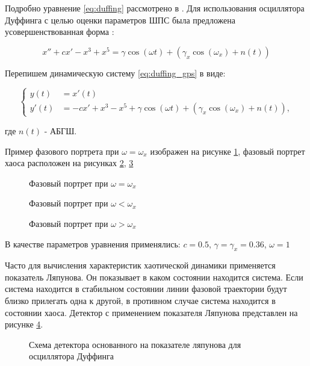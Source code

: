 Подробно уравнение \ref{eq:duffing} рассмотрено в \cite{chaos_neimark_landa}.
Для использования осциллятора Дуффинга с целью оценки параметров ШПС была предложена усовершенствованная форма \cite{chaos_song, chaos_chen}:
\begin{center}
\begin{equation}
	\label{eq:duffing_gps}
	x'' +cx' - x^3 + x^5 = \gamma\cos(\omega{t}) + (\gamma_{x}\cos(\omega_{x}) + n(t))
\end{equation}
\end{center}

Перепишем динамическую систему \ref{eq:duffing_gps} в виде:
\begin{center}
\begin{equation}
	\label{eq:duffing_gps_2}
	\left\{
	\begin{aligned}
		y(t) & = x'(t) \\
		y'(t) & =  -cx' + x^3 - x^5 + \gamma\cos(\omega{t}) + (\gamma_{x}\cos(\omega_{x}) + n(t)),
	\end{aligned}
	\right.
\end{equation}
\end{center}
где ${n(t)}$ - АБГШ.

Пример фазового портрета при ${\omega=\omega_{x}}$ изображен на рисунке \ref{pic:duffing_sync},
фазовый портрет хаоса расположен на рисунках \ref{pic:duffing_chaos1}, \ref{pic:duffing_chaos2}
\begin{figure}[H]
	\center{}
	\caption{Фазовый портрет при ${\omega =\omega_{x}}$}
	\label{pic:duffing_sync}
\end{figure}
\begin{figure}[H]
	\center{}
	\caption{Фазовый портрет при ${\omega < \omega_{x}}$}
	\label{pic:duffing_chaos1}
\end{figure}
\begin{figure}[H]
	\center{}
	\caption{Фазовый портрет при ${\omega > \omega_{x}}$}
	\label{pic:duffing_chaos2}
\end{figure}
В качестве параметров уравнения применялись: $c = 0.5$, $\gamma=\gamma_{x}=0.36$, ${\omega=1}$

Часто для вычисления характеристик хаотической динамики применяется показатель Ляпунова.
Он показывает в каком состоянии находится система. Если система находится
в стабильном состоянии линии фазовой траектории будут близко прилегать одна к другой, в противном
случае система находится в состоянии хаоса. Детектор с применением показателя Ляпунова
представлен на рисунке \ref{pic:chaos_lyapunov}.
\begin{figure}[H]
	\center{}
	\caption{Схема детектора основанного на показателе ляпунова для осциллятора Дуффинга}
	\label{pic:chaos_lyapunov}
\end{figure}

